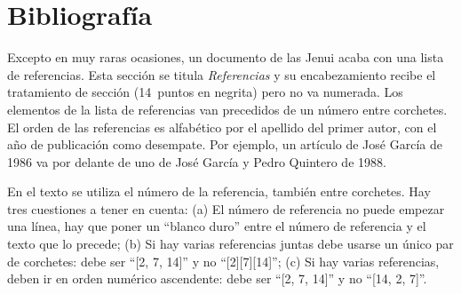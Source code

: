 \documentclass[twocolumn,twoside,a4paper, 10pt]{article}
\begin{document}
\section{Bibliografía}

Excepto en muy raras ocasiones, un documento de las Jenui acaba con 
una lista de referencias. Esta sección se titula \emph{Referencias} y su 
encabezamiento recibe el tratamiento de sección (14~puntos en 
negrita) pero no va numerada. Los elementos de la lista de 
referencias van precedidos de un número entre corchetes. El orden de 
las referencias es alfabético por el apellido del primer autor, con el año de 
publicación como desempate.  Por ejemplo, un artículo de José García 
de 1986 va por delante de uno de José García y Pedro Quintero de 1988.	

En el texto se utiliza el número de la referencia, también entre 
corchetes. Hay tres cuestiones a tener en cuenta: (a) El número de 
referencia no puede empezar una línea, hay que poner un ``blanco 
duro'' entre el número de referencia y el texto que lo precede; (b) 
Si hay varias referencias juntas debe usarse un único par de 
corchetes: debe ser ``[2, 7, 14]'' y no ``[2][7][14]''; (c) Si hay 
varias referencias, deben ir en orden numérico ascendente: debe ser  
``[2, 7, 14]'' y no ``[14, 2, 7]''.
\end{document}
